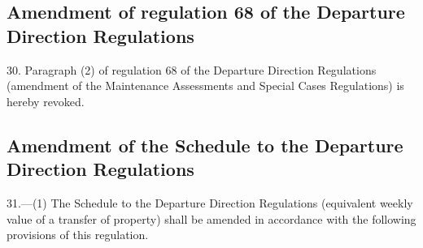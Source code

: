 \documentclass[12pt,a4paper]{article}
\begin{document}
\subsection[30. Amendment of regulation 68 of the Departure Direction Regulations]{Amendment of regulation 68 of the Departure Direction Regulations}

30.  Paragraph (2) of regulation 68 of the Departure Direction Regulations (amendment of the Maintenance Assessments and Special Cases Regulations) is hereby revoked.

\subsection[31. Amendment of the Schedule to the Departure Direction Regulations]{Amendment of the Schedule to the Departure Direction Regulations}

31.—(1) The Schedule to the Departure Direction Regulations (equivalent weekly value of a transfer of property) shall be amended in accordance with the following provisions of this regulation.
\end{document}
